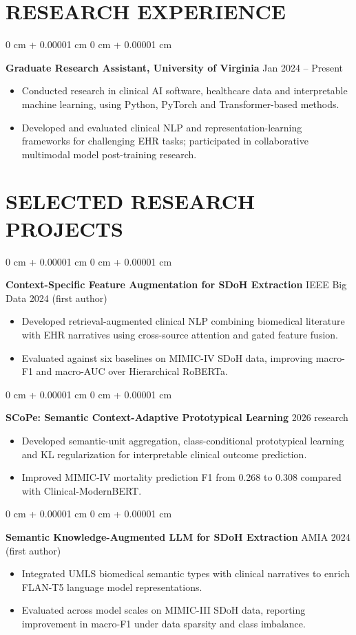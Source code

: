 \documentclass[10pt, letterpaper]{article}
\newenvironment{highlights}{
    \begin{itemize}[
        topsep=0.03 cm,
        parsep=0.03 cm,
        partopsep=0pt,
        itemsep=0pt,
        leftmargin=0 cm + 10pt
    ]
}{
    \end{itemize}
} %
\newenvironment{onecolentry}{
    \begin{adjustwidth}{
        0 cm + 0.00001 cm
    }{
        0 cm + 0.00001 cm
    }
}{
    \end{adjustwidth}
} %
\begin{document}
\section{RESEARCH EXPERIENCE}
\begin{onecolentry}
\textbf{Graduate Research Assistant, University of Virginia} \hfill Jan 2024 -- Present
\begin{highlights}
\item Conducted research in clinical AI software, healthcare data and interpretable machine learning, using Python, PyTorch and Transformer-based methods.
\item Developed and evaluated clinical NLP and representation-learning frameworks for challenging EHR tasks; participated in collaborative multimodal model post-training research.
\end{highlights}
\end{onecolentry}
\section{SELECTED RESEARCH PROJECTS}
\begin{onecolentry}
\textbf{Context-Specific Feature Augmentation for SDoH Extraction} \hfill IEEE Big Data 2024 (first author)
\begin{highlights}
\item Developed retrieval-augmented clinical NLP combining biomedical literature with EHR narratives using cross-source attention and gated feature fusion.
\item Evaluated against six baselines on MIMIC-IV SDoH data, improving macro-F1 and macro-AUC over Hierarchical RoBERTa.
\end{highlights}
\end{onecolentry}
\vspace{0.025 cm}
\begin{onecolentry}
\textbf{SCoPe: Semantic Context-Adaptive Prototypical Learning} \hfill 2026 research
\begin{highlights}
\item Developed semantic-unit aggregation, class-conditional prototypical learning and KL regularization for interpretable clinical outcome prediction.
\item Improved MIMIC-IV mortality prediction F1 from 0.268 to 0.308 compared with Clinical-ModernBERT.
\end{highlights}
\end{onecolentry}
\vspace{0.025 cm}
\begin{onecolentry}
\textbf{Semantic Knowledge-Augmented LLM for SDoH Extraction} \hfill AMIA 2024 (first author)
\begin{highlights}
\item Integrated UMLS biomedical semantic types with clinical narratives to enrich FLAN-T5 language model representations.
\item Evaluated across model scales on MIMIC-III SDoH data, reporting improvement in macro-F1 under data sparsity and class imbalance.
\end{highlights}
\end{onecolentry}
\vspace{0.025 cm}
\end{document}
